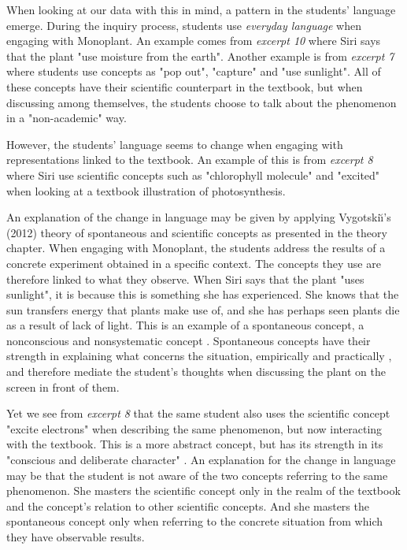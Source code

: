 When looking at our data with this in mind, a pattern in the students' language emerge. During the inquiry process, students use \emph{everyday language} when engaging with Monoplant. An example comes from \emph{excerpt 10} where Siri says that the plant "use moisture from the earth". Another example is from \emph{excerpt 7} where students use concepts as "pop out", "capture" and "use sunlight". All of these concepts have their scientific counterpart in the textbook, but when discussing among themselves, the students choose to talk about the phenomenon in a "non-academic" way. 

However, the students' language seems to change when engaging with representations linked to the textbook. An example of this is from \emph{excerpt 8} where Siri use scientific concepts such as "chlorophyll molecule" and "excited" when looking at a textbook illustration of photosynthesis. 

An explanation of the change in language may be given by applying Vygotski{\u\i}'s (2012) theory of spontaneous and scientific concepts as presented in the theory chapter. When engaging with Monoplant, the students address the results of a concrete experiment obtained in a specific context. The concepts they use are therefore linked to what they observe. When Siri says that the plant "uses sunlight", it is because this is something she has experienced. She knows that the sun transfers energy that plants make use of, and she has perhaps seen plants die as a result of lack of light. This is an example of a spontaneous concept, a nonconscious and nonsystematic concept \citep{vygotsky2012thought}. Spontaneous concepts have their strength in explaining what concerns the situation, empirically and practically \citep{vygotsky2012thought}, and  therefore mediate the student's thoughts when discussing the plant on the screen in front of them. 


Yet we see from \emph{excerpt 8} that the same student also uses the scientific concept "excite electrons" when describing the same phenomenon, but now interacting with the textbook. This is a more abstract concept, but has its strength in its "conscious and deliberate character" \citep[p. 194]{vygotsky2012thought}. An explanation for the change in language may be that the student is not aware of the two concepts referring to the same phenomenon. She masters the scientific concept only in the realm of the textbook and the concept's relation to other scientific concepts. And she masters the spontaneous concept only when referring to the concrete situation from which they have observable results. 

